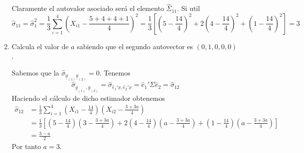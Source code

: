 \documentclass[twoside]{article}
\newcommand{\muestra}[1]{{\underline{#1}}}
\begin{document}
\begin{enumerate}
\begin{enumerate}
	Claramente el autovalor asociado será el elemento $\hat{\Sigma}_{11}$. Si util
$$
\hat{\sigma}_{11}=\hat{\sigma}_1^2=\frac{1}{3}\sum_{i=1}^4(X_{i1}-\frac{5+4+4+1}{4})^2 = \frac{1}{3}\left[(5-\frac{14}{4})^2 +  2(4-\frac{14}{4})^2 + (1-\frac{14}{4})^2\right]= 3
$$

	\item Calcula el valor de $a$ sabiendo que el segundo autovector es $(0,1,0,0,0)$. 
	
Sabemos que la $\hat{\sigma}_{\muestra{y}_{(1)}\muestra{y}_{(2)}}=0$. Tenemos
$$
\hat{\sigma}_{\muestra{y}_{(1)},\muestra{y}_{(2)}} = \hat{\sigma}_{\hat{e}_1'\muestra{x},\hat{e}_2'\muestra{x}} = \hat{e}_1'\Sigma \hat{e}_2 = \hat{\sigma}_{12}
$$
Haciendo el cálculo de dicho estimador obtenemos
\begin{align*}
\hat{\sigma}_{12}&=\frac{1}{3}\sum_{i=1}^4(X_{i1}-\frac{14}{4})(X_{i2}-\frac{3+3a}{4})\\
&=\frac{1}{3}\left[(5-\frac{14}{4})(3-\frac{3+3a}{4})+2(4-\frac{14}{4})(a-\frac{3+3a}{4})+(1-\frac{14}{4})(a-\frac{3+3a}{4})\right]\\
&=\frac{3-a}{2}
\end{align*}
Por tanto $a=3$.

\end{enumerate}
\end{enumerate}
\newpage
\end{document}
